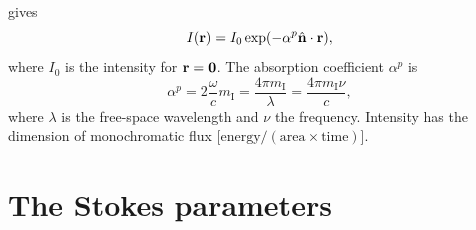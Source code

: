  gives
\begin{equation}
  I(\mathbf{r}) = I_0 \exp(-\alpha^p \hat{{\bf n}} \cdot \mathbf{r}),
\end{equation}
where $I_0$ is the intensity for $\mathbf{r} = \mathbf{0}$. The absorption
coefficient $\alpha^p$ is
\begin{equation}
  \alpha^p =
  2 \frac{\omega}{c} m_{\mathrm{I}} =
    \frac{4\pi m_{\mathrm{I}}}{\lambda} =
    \frac{4\pi m_{\mathrm{I}}\nu}{c},
\end{equation}
where $\lambda$ is the free-space wavelength and $\nu$ the frequency.
Intensity has the dimension of monochromatic flux
[$\mathrm{energy}/(\mathrm{area}\times\mathrm{time})$].
  

\section[The Stokes parameters]{The Stokes parameters}
  

